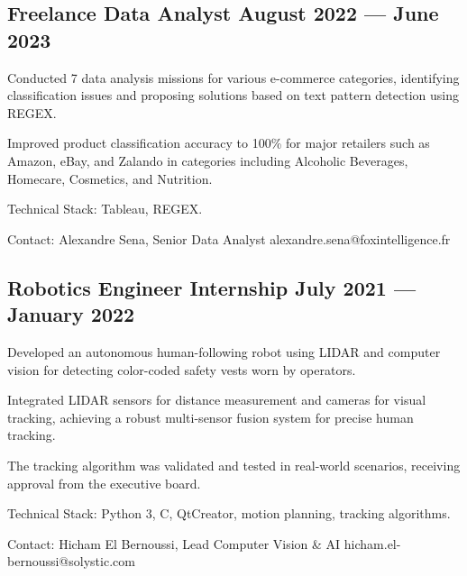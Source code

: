 \subsection{{Freelance Data Analyst \hfill August 2022 --- June 2023}}
\begin{zitemize}
\item Conducted 7 data analysis missions for various e-commerce categories, identifying classification issues and proposing solutions based on text pattern detection using REGEX.
\item Improved product classification accuracy to 100\% for major retailers such as Amazon, eBay, and Zalando in categories including Alcoholic Beverages, Homecare, Cosmetics, and Nutrition.
\item Technical Stack: Tableau, REGEX.
\item Contact: Alexandre Sena, Senior Data Analyst \hfill alexandre.sena@foxintelligence.fr
\end{zitemize}

\subsection{{Robotics Engineer Internship \hfill July 2021 --- January 2022}}
\begin{zitemize}
\item Developed an autonomous human-following robot using LIDAR and computer vision for detecting color-coded safety vests worn by operators.
\item Integrated LIDAR sensors for distance measurement and cameras for visual tracking, achieving a robust multi-sensor fusion system for precise human tracking.
\item The tracking algorithm was validated and tested in real-world scenarios, receiving approval from the executive board.
\item Technical Stack: Python 3, C, QtCreator, motion planning, tracking algorithms.
\item Contact: Hicham El Bernoussi, Lead Computer Vision & AI \hfill hicham.el-bernoussi@solystic.com
\end{zitemize}
